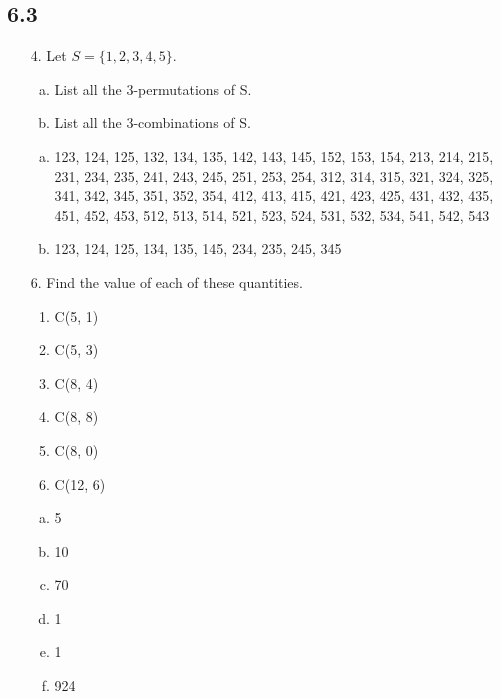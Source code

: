 \subsection{6.3}
\begin{itemize}
    \item[4.]Let $S = \{1, 2, 3, 4, 5\}$.
          \begin{enumerate}[a.]
              \item List all the 3-permutations of S.
              \item List all the 3-combinations of S.
          \end{enumerate}
          \answer
          \begin{enumerate}[a.]
              \item 123, 124, 125, 132, 134, 135, 142, 143, 145, 152, 153, 154,
                    213, 214, 215, 231, 234, 235, 241, 243, 245, 251, 253, 254, 312, 314, 315,
                    321, 324, 325, 341, 342, 345, 351, 352, 354, 412, 413, 415, 421, 423, 425,
                    431, 432, 435, 451, 452, 453, 512, 513, 514, 521, 523, 524, 531, 532, 534,
                    541, 542, 543
              \item 123, 124, 125, 134, 135, 145, 234, 235, 245, 345
          \end{enumerate}

    \item[6.]  Find the value of each of these quantities.
          \begin{enumerate}
              \item C(5, 1)
              \item C(5, 3)
              \item C(8, 4)
              \item C(8, 8)
              \item C(8, 0)
              \item C(12, 6)
          \end{enumerate}
          \answer
          \begin{enumerate}[a.]
              \item 5
              \item 10
              \item 70
              \item 1
              \item 1
              \item 924
          \end{enumerate}


\end{itemize}
